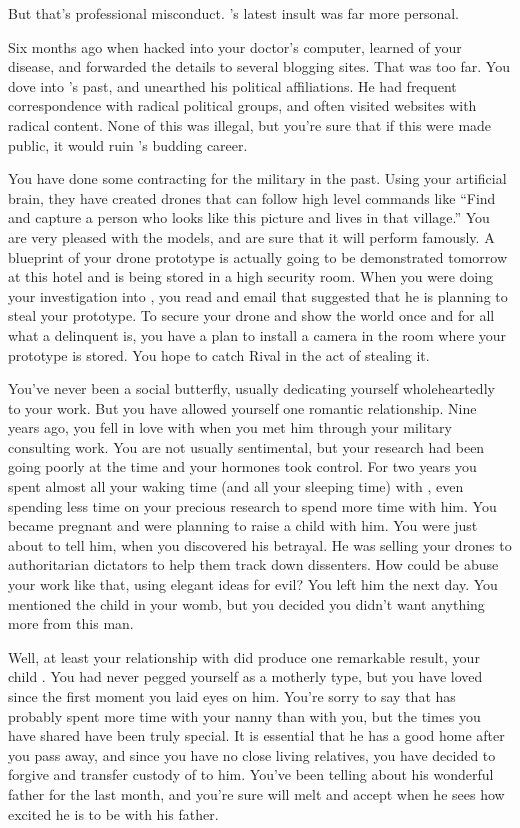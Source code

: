 \documentclass[char]{guildcamp1}
\begin{document}
But that's professional misconduct. \cRival{}'s latest insult was far more personal.

Six months ago when \cRival{} hacked into your doctor's computer, learned of your disease, and forwarded the details to several blogging sites. That was too far. You dove into \cRival{}'s past, and unearthed his political affiliations. He had frequent correspondence with radical political groups, and often visited websites with radical content. None of this was illegal, but you're sure that if this were made public, it would ruin \cRival{}'s budding career.

You have done some contracting for the military in the past.  Using your artificial brain, they have created drones that can follow high level commands like ``Find and capture a person who looks like this picture and lives in that village.''  You are very pleased with the models, and are sure that it will perform famously.  A blueprint of your drone prototype is actually going to be demonstrated tomorrow at this hotel and is being stored in a high security room.  When you were doing your investigation into \cRival{}, you read and email that suggested that he is planning to steal your prototype.  To secure your drone and show the world once and for all what a delinquent \cRival{} is, you have a plan to install a camera in the room where your prototype is stored.  You hope to catch Rival in the act of stealing it.

 You've never been a social butterfly, usually dedicating yourself wholeheartedly to your work. But you have allowed yourself one romantic relationship.  Nine years ago, you fell in love with \cGroomA{\intro{}} when you met him through your military consulting work.  You are not usually sentimental, but your research had been going poorly at the time and your hormones took control. For two years you spent almost all your waking time (and all your sleeping time) with \cGroomA{}, even spending less time on your precious research to spend more time with him.  You became pregnant and were planning to raise a child with him. You were just about to tell him, when you discovered his betrayal.  He was selling your drones to authoritarian dictators to help them track down dissenters.  How could be abuse your work like that, using elegant ideas for evil?  You left him the next day.  You mentioned the child in your womb, but you decided you didn't want anything more from this man.
 
Well, at least your relationship with \cGroomA{} did produce one remarkable result, your child \cKid{}. You had never pegged yourself as a motherly type, but you have loved \cKid{} since the first moment you laid eyes on him.  You're sorry to say that \cKid{} has probably spent more time with your nanny than with you, but the times you have shared have been truly special.  It is essential that he has a good home after you pass away, and since you have no close living relatives, you have decided to forgive \cGroomA{} and transfer custody of \cKid{} to him.  You've been telling \cKid{} about his wonderful father for the last month, and you're sure \cGroomA{} will melt and accept \cKid{} when he sees how excited he is to be with his father.
\end{document}
